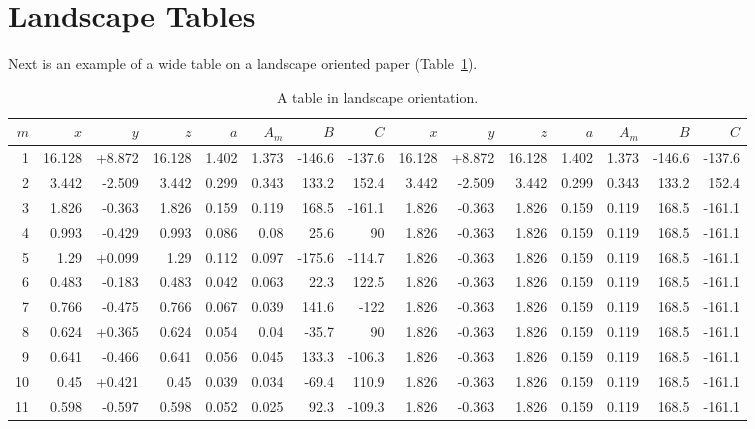 \blindtext

\section{Landscape Tables}
Next is an example of a wide table on a landscape oriented paper (Table~\ref{tab:land}).

\begin{landscape}
  \pagestyle{empty} %
  \begin{table}[h]
    \caption[A landscape table]{A table in landscape orientation.}
    \label{tab:land}
    \begin{tabular}{rrrrrrrrrrrrrrr} \toprule
      {$m$} & {$x$} & {$y$} & {$z$} & {$a$} & {$A_m$} & {$B$} & {$C$} & {$x$} & {$y$} & {$z$} & {$a$} & {$A_m$} & {$B$} & {$C$} \\ \midrule
      1  & 16.128 & +8.872 & 16.128 & 1.402 & 1.373 & -146.6 & -137.6 & 16.128 & +8.872 & 16.128 & 1.402 & 1.373 & -146.6 & -137.6\\
      2  & 3.442  & -2.509 & 3.442  & 0.299 & 0.343 & 133.2  & 152.4 & 3.442  & -2.509 & 3.442  & 0.299 & 0.343 & 133.2  & 152.4 \\
      3  & 1.826  & -0.363 & 1.826  & 0.159 & 0.119 & 168.5  & -161.1 & 1.826  & -0.363 & 1.826  & 0.159 & 0.119 & 168.5  & -161.1 \\
      4  & 0.993  & -0.429 & 0.993  & 0.086 & 0.08  & 25.6   & 90 & 1.826  & -0.363 & 1.826  & 0.159 & 0.119 & 168.5  & -161.1    \\ \midrule
      5  & 1.29   & +0.099 & 1.29   & 0.112 & 0.097 & -175.6 & -114.7 & 1.826  & -0.363 & 1.826  & 0.159 & 0.119 & 168.5  & -161.1\\
      6  & 0.483  & -0.183 & 0.483  & 0.042 & 0.063 & 22.3   & 122.5 & 1.826  & -0.363 & 1.826  & 0.159 & 0.119 & 168.5  & -161.1 \\
      7  & 0.766  & -0.475 & 0.766  & 0.067 & 0.039 & 141.6  & -122 & 1.826  & -0.363 & 1.826  & 0.159 & 0.119 & 168.5  & -161.1  \\
      8  & 0.624  & +0.365 & 0.624  & 0.054 & 0.04  & -35.7  & 90  & 1.826  & -0.363 & 1.826  & 0.159 & 0.119 & 168.5  & -161.1   \\ \midrule
      9  & 0.641  & -0.466 & 0.641  & 0.056 & 0.045 & 133.3  & -106.3 & 1.826  & -0.363 & 1.826  & 0.159 & 0.119 & 168.5  & -161.1\\
      10 & 0.45   & +0.421 & 0.45   & 0.039 & 0.034 & -69.4  & 110.9  & 1.826  & -0.363 & 1.826  & 0.159 & 0.119 & 168.5  & -161.1\\
      11 & 0.598  & -0.597 & 0.598  & 0.052 & 0.025 & 92.3   & -109.3 & 1.826  & -0.363 & 1.826  & 0.159 & 0.119 & 168.5  & -161.1\\ \bottomrule
    \end{tabular}
  \end{table}
\end{landscape}

